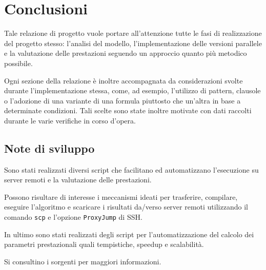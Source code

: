 \section{Conclusioni}

Tale relazione di progetto vuole portare all'attenzione tutte le fasi di
realizzazione del progetto stesso: l'analisi del modello, l'implementazione
delle versioni parallele e la valutazione delle prestazioni seguendo un
approccio quanto più metodico possibile.

Ogni sezione della relazione è inoltre accompagnata da considerazioni svolte
durante l'implementazione stessa, come, ad esempio, l'utilizzo di pattern,
clausole o l'adozione di una variante di una formula piuttosto che un'altra in
base a determinate condizioni. Tali scelte sono state inoltre motivate con dati
raccolti durante le varie verifiche in corso d'opera.

\subsection{Note di sviluppo}

Sono stati realizzati diversi script che facilitano ed automatizzano
l'esecuzione su server remoti e la valutazione delle prestazioni.

Possono risultare di interesse i meccanismi ideati per trasferire, compilare,
eseguire l'algoritmo e scaricare i risultati da/verso server remoti utilizzando
il comando \texttt{scp} e l'opzione \texttt{ProxyJump} di SSH.

In ultimo sono stati realizzati degli script per l'automatizzazione del calcolo
dei parametri prestazionali quali tempistiche, speedup e scalabilità.

Si consultino i sorgenti per maggiori informazioni.
